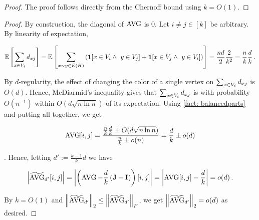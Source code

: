 \begin{proof}
    The proof follows directly from the Chernoff bound using $k=O(1)$.
\end{proof}


\begin{proof}
    By construction, the diagonal of $\AVG$ is $0$. Let $i\neq j\in [k]$ be arbitrary. By linearity of expectation,
    
    $$\operatorname*{\mathbb{E}}\left[\sum_{x\in V_i} d_{xj}\right]=\operatorname*{\mathbb{E}}\left[\sum_{x\sim y\in E(H)}\left(\mathbf{1}[x\in V_i\land\ y\in V_j]+\mathbf{1}[x\in V_j\land\ y\in V_i]\right)\right]=\frac{nd}{2}\frac{2}{k^2}=\frac{n}{k}\frac{d}{k}\,.$$
    
    By $d$-regularity, the effect of changing the color of a single vertex on $\sum_{x\in V_i} d_{xj}$ is $O(d)$. Hence, McDiarmid's inequality gives that $\sum_{x\in V_i} d_{xj}$ is with probability $O(n^{-1})$ within $O(d\sqrt{n\ln{n}})$ of its expectation. Using \cref{fact: balancedparts} and putting all together, we get

    $$\AVG{i}{j}=\frac{\frac{n}{k}\frac{d}{k}\pm O(d\sqrt{n\ln{n}})}{\frac{n}{k}\pm o(n)}=\frac{d}{k}\pm o(d)$$

    \whp. Hence, letting $d':=\frac{k-1}{k}d$ we have

    $$\Abs{\nAVG_{d'}[i, j]}= \Abs{\Paren{\AVG-\frac{d}{k}\Paren{\Allones-\Id}}[i, j]}=\Abs{\AVG{i}{j}-\frac{d}{k}}=o(d)\,.$$

    By $k=O(1)$ and $\Norm{\nAVG_{d'}}_2\leq \Norm{\nAVG_{d'}}_F$, we get $\Norm{\nAVG_{d'}}_2=o(d)$ as desired.
\end{proof}



